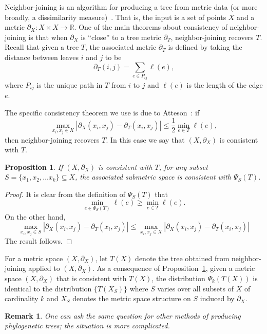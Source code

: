\documentclass[a4paper,11pt]{article}
\newtheorem{proposition}[theorem]{Proposition}
\newtheorem{remark}[theorem]{Remark}
\begin{document}
Neighbor-joining is an algorithm for producing a tree from metric data (or more broadly, a dissimilarity measure)~\cite{felsenstein2003}.
That is, the input is a set of points $X$ and a metric $\partial_X \colon X \times X \to \mathbb{R}$.
One of the main theorems about consistency of neighbor-joining is that when $\partial_X$ is ``close'' to a tree metric $\partial_T$, neighbor-joining recovers $T$.
Recall that given a tree $T$, the associated metric $\partial_T$ is defined by taking the distance between leaves $i$ and $j$ to be 
\[
\partial_T(i,j) = \sum_{e \in P_{ij}} \ell(e),
\]
where $P_{ij}$ is the unique path in $T$ from $i$ to $j$ and $\ell(e)$ is the length of the edge $e$.

The specific consistency theorem we use is due to Atteson~\cite{atteson}: if
\[
\max_{x_i,x_j \in X} |\partial_X(x_i,x_j) - \partial_T(x_i,x_j)| \leq \frac{1}{2} \min_{e \in T} \ell(e),
\]
then neighbor-joining recovers $T$.
In this case we say that $(X, \partial_X)$ is consistent with $T$.

\begin{proposition}\label{prop:subnj}
If $(X,\partial_X)$ is consistent with $T$, for any subset $S = \{x_1, x_2, \ldots x_k\} \subseteq X$, the associated submetric space is consistent with $\Psi_S(T)$.
\end{proposition}

\begin{proof}
It is clear from the definition of $\Psi_S(T)$ that 
\[
\min_{e \in \Psi_S(T)} \ell(e) \geq \min_{e \in T} \ell(e).
\]
On the other hand, 
\[
\max_{x_i,x_j \in S} |\partial_X(x_i,x_j) - \partial_T(x_i,x_j)| \leq
\max_{x_i,x_j \in X} |\partial_X(x_i,x_j) - \partial_T(x_i,x_j)| 
\]
The result follows.
\end{proof}

For a metric space $(X,\partial_X)$, let $T(X)$ denote the tree
obtained from neighbor-joining applied to $(X,\partial_X)$.  As a
consequence of Proposition~\ref{prop:subnj}, given a metric space $(X,
\partial_X)$ that is consistent with $T(X)$, the distribution
$\Psi_k(T(X))$ is identical to the distribution $\{T(X_S)\}$ where $S$
varies over all subsets of $X$ of cardinality $k$ and $X_S$ denotes
the metric space structure on $S$ induced by $\partial_X$.

\begin{remark}
One can ask the same question for other methods of producing
phylogenetic trees; the situation is more complicated.
\end{remark}
\end{document}

